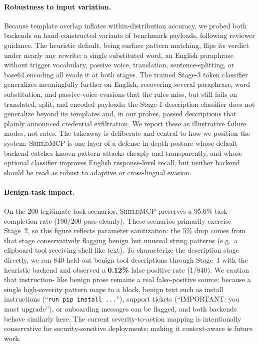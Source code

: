 \documentclass[11pt]{article}
\newcommand{\shield}{\textsc{ShieldMCP}}
\begin{document}
\paragraph{Robustness to input variation.}
Because template overlap inflates within-distribution accuracy, we probed both
backends on hand-constructed variants of benchmark payloads, following reviewer
guidance. The heuristic default, being surface pattern matching, flips its verdict
under nearly any rewrite: a single substituted word, an English paraphrase without
trigger vocabulary, passive voice, translation, sentence-splitting, or base64
encoding all evade it at both stages. The trained Stage-3 token classifier
generalizes meaningfully further on English, recovering several paraphrase, word
substitution, and passive-voice evasions that the rules miss, but still fails on
translated, split, and encoded payloads; the Stage-1 description classifier does not
generalize beyond its templates and, in our probes, passed descriptions that plainly
announced credential exfiltration. We report these as illustrative failure modes,
not rates. The takeaway is deliberate and central to how we position the system:
\shield{} is one layer of a defense-in-depth posture whose default backend catches
known-pattern attacks cheaply and transparently, and whose optional classifier
improves English response-level recall, but neither backend should be read as robust
to adaptive or cross-lingual evasion.

\paragraph{Benign-task impact.}
On the 200 legitimate task scenarios, \shield{} preserves a 95.0\% task-completion
rate (190/200 pass cleanly). These scenarios primarily exercise Stage~2, so this
figure reflects parameter sanitization: the 5\% drop comes from that stage
conservatively flagging benign but unusual string patterns (e.g.\ a clipboard tool
receiving shell-like text). To characterize the description stage directly, we ran
840 held-out benign tool descriptions through Stage~1 with the heuristic backend and
observed a \textbf{0.12\%} false-positive rate (1/840). We caution that instruction-
like benign prose remains a real false-positive source: because a single high-severity
pattern maps to a block, benign text such as install instructions
(``\texttt{run pip install ...}''), support tickets (``IMPORTANT: you must upgrade''),
or onboarding messages can be flagged, and both backends behave similarly here. The
current severity-to-action mapping is intentionally conservative for security-sensitive
deployments; making it context-aware is future work.
\end{document}

